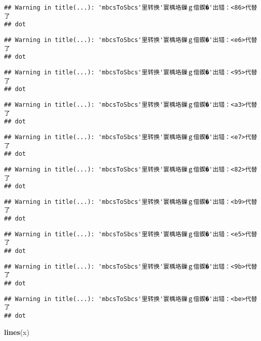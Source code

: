 \documentclass[]{article}
\newenvironment{Shaded}{\begin{snugshade}}{\end{snugshade}}
\newcommand{\KeywordTok}[1]{\textcolor[rgb]{0.13,0.29,0.53}{\textbf{#1}}}
\newcommand{\NormalTok}[1]{#1}
\begin{document}
\begin{verbatim}
## Warning in title(...): 'mbcsToSbcs'里转换'寰楀垎鏁ｇ偣鍥�'出错：<86>代替了
## dot
\end{verbatim}

\begin{verbatim}
## Warning in title(...): 'mbcsToSbcs'里转换'寰楀垎鏁ｇ偣鍥�'出错：<e6>代替了
## dot
\end{verbatim}

\begin{verbatim}
## Warning in title(...): 'mbcsToSbcs'里转换'寰楀垎鏁ｇ偣鍥�'出错：<95>代替了
## dot
\end{verbatim}

\begin{verbatim}
## Warning in title(...): 'mbcsToSbcs'里转换'寰楀垎鏁ｇ偣鍥�'出错：<a3>代替了
## dot
\end{verbatim}

\begin{verbatim}
## Warning in title(...): 'mbcsToSbcs'里转换'寰楀垎鏁ｇ偣鍥�'出错：<e7>代替了
## dot
\end{verbatim}

\begin{verbatim}
## Warning in title(...): 'mbcsToSbcs'里转换'寰楀垎鏁ｇ偣鍥�'出错：<82>代替了
## dot
\end{verbatim}

\begin{verbatim}
## Warning in title(...): 'mbcsToSbcs'里转换'寰楀垎鏁ｇ偣鍥�'出错：<b9>代替了
## dot
\end{verbatim}

\begin{verbatim}
## Warning in title(...): 'mbcsToSbcs'里转换'寰楀垎鏁ｇ偣鍥�'出错：<e5>代替了
## dot
\end{verbatim}

\begin{verbatim}
## Warning in title(...): 'mbcsToSbcs'里转换'寰楀垎鏁ｇ偣鍥�'出错：<9b>代替了
## dot
\end{verbatim}

\begin{verbatim}
## Warning in title(...): 'mbcsToSbcs'里转换'寰楀垎鏁ｇ偣鍥�'出错：<be>代替了
## dot
\end{verbatim}

\begin{Shaded}
\begin{Highlighting}[]
\KeywordTok{lines}\NormalTok{(x)}
\end{Highlighting}
\end{Shaded}
\end{document}
